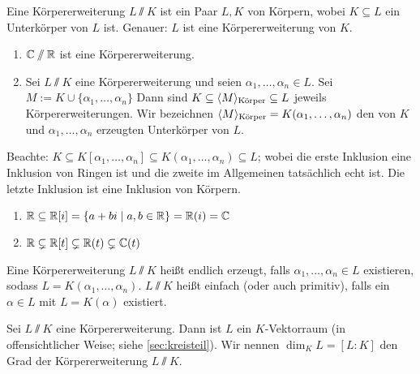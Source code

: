 \documentclass[12pt,a4paper]{scrartcl}
\begin{document}
\begin{defi}
	Eine Körpererweiterung $L\sslash K$ ist ein Paar $L, K$ von Körpern, wobei $K\subseteq L$ ein Unterkörper von $L$ ist. Genauer: $L$ ist eine Körpererweiterung von $K$.	
\end{defi}

\begin{bsp}
	\leavevmode
	\begin{enumerate}
		\item $\mathbb C\sslash\mathbb R$ ist eine Körpererweiterung.
		\item Sei $L\sslash K$ eine Körpererweiterung und seien $\alpha_1, \dots, \alpha_n\in L$. Sei $M:=K\cup \{\alpha_1,\dots, \alpha_n\}$ Dann sind $K \subseteq \langle M\rangle_{\text{Körper}}\subseteq L$ jeweils Körpererweiterungen. Wir bezeichnen $\langle M\rangle_{\text{Körper}} = K(\alpha_1,\dots, \alpha_n)$ den von $K$ und $\alpha_1,\dots,\alpha_n$ erzeugten Unterkörper von $L$.
	\end{enumerate}
\end{bsp}
Beachte: $K\subseteq K[\alpha_1,\dots, \alpha_n]\subseteq K(\alpha_1,\dots, \alpha_n)\subseteq L$; wobei die erste Inklusion eine Inklusion von Ringen ist und die zweite im Allgemeinen tatsächlich echt ist. Die letzte Inklusion ist eine Inklusion von Körpern.

\begin{bsp}
	\leavevmode
	\begin{enumerate}
		\item $\mathbb R\subseteq \mathbb R[i] = \{a+bi\mid a,b\in\mathbb R\} = \mathbb R(i) = \mathbb C$
		\item $\mathbb R\subsetneq \mathbb R[t]\subsetneq \mathbb R(t) \subsetneq \mathbb C(t)$
	\end{enumerate}
\end{bsp}

\begin{defi}
	Eine Körpererweiterung $L\sslash K$ heißt endlich erzeugt, falls $\alpha_1,\dots, \alpha_n\in L$ existieren, sodass $L = K(\alpha_1,\dots, \alpha_n)$. $L\sslash K$ heißt einfach (oder auch primitiv), falls ein $\alpha\in L$ mit $L = K(\alpha)$ existiert.
\end{defi}

\begin{defi}
	Sei $L\sslash K$ eine Körpererweiterung. Dann ist $L$ ein $K$-Vektorraum (in offensichtlicher Weise; siehe \cref{sec:kreisteil}). Wir nennen $\dim_KL = [L:K]$ den Grad der Körpererweiterung $L\sslash K$.
\end{defi}
\end{document}
